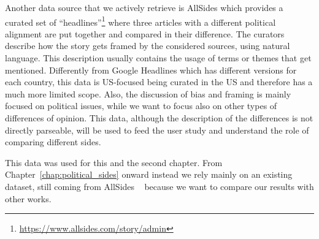 Another data source that we actively retrieve is AllSides which provides a curated set of ``headlines''\footnote{\url{https://www.allsides.com/story/admin}} where three articles with a different political alignment are put together and compared in their difference.
The curators describe how the story gets framed by the considered sources, using natural language.
This description usually contains the usage of terms or themes that get mentioned.
Differently from Google Headlines which has different versions for each country, this data is US-focused being curated in the US and therefore has a much more limited scope. Also, the discussion of bias and framing is mainly focused on political issues, while we want to focus also on other types of differences of opinion.
This data, although the description of the differences is not directly parseable, will be used to feed the user study and understand the role of comparing different sides.



This data was used for this and the second chapter. From Chapter~\ref{chap:political_sides} onward instead we rely mainly on an existing dataset, still coming from AllSides ~\citep{baly-dataset} because we want to compare our results with other works.


